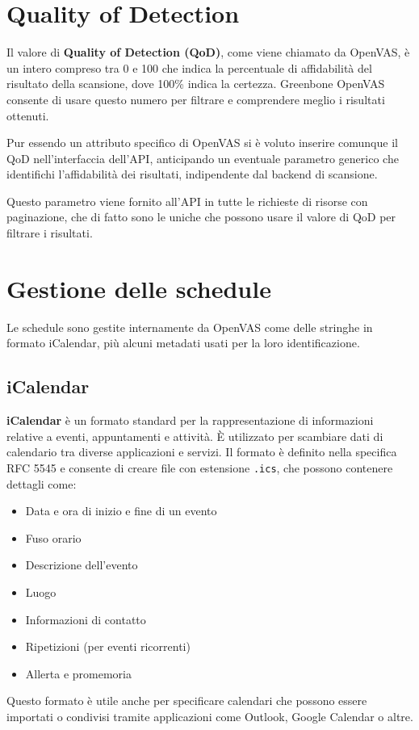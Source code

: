 \section{Quality of Detection}
Il valore di \textbf{Quality of Detection (QoD)}, come viene chiamato da OpenVAS, è un intero compreso tra 0 e 100 che indica la percentuale di affidabilità del risultato della scansione, dove 100\% indica la certezza. Greenbone OpenVAS consente di usare questo numero per filtrare e comprendere meglio i risultati ottenuti.

Pur essendo un attributo specifico di OpenVAS si è voluto inserire comunque il QoD nell'interfaccia dell'API, anticipando un eventuale parametro generico che identifichi l'affidabilità dei risultati, indipendente dal backend di scansione.

Questo parametro viene fornito all'API in tutte le richieste di risorse con paginazione, che di fatto sono le uniche che possono usare il valore di QoD per filtrare i risultati.

\section{Gestione delle schedule}
Le schedule sono gestite internamente da OpenVAS come delle stringhe in formato iCalendar, più alcuni metadati usati per la loro identificazione.

\subsection{iCalendar}
\textbf{iCalendar} è un formato standard per la rappresentazione di informazioni relative a eventi, appuntamenti e attività. È utilizzato per scambiare dati di calendario tra diverse applicazioni e servizi. Il formato è definito nella specifica RFC 5545 e consente di creare file con estensione \texttt{.ics}, che possono contenere dettagli come:
\begin{itemize}
    \item Data e ora di inizio e fine di un evento
    \item Fuso orario
    \item Descrizione dell'evento
    \item Luogo
    \item Informazioni di contatto
    \item Ripetizioni (per eventi ricorrenti)
    \item Allerta e promemoria
\end{itemize}
Questo formato è utile anche per specificare calendari che possono essere importati o condivisi tramite applicazioni come Outlook, Google Calendar o altre.

